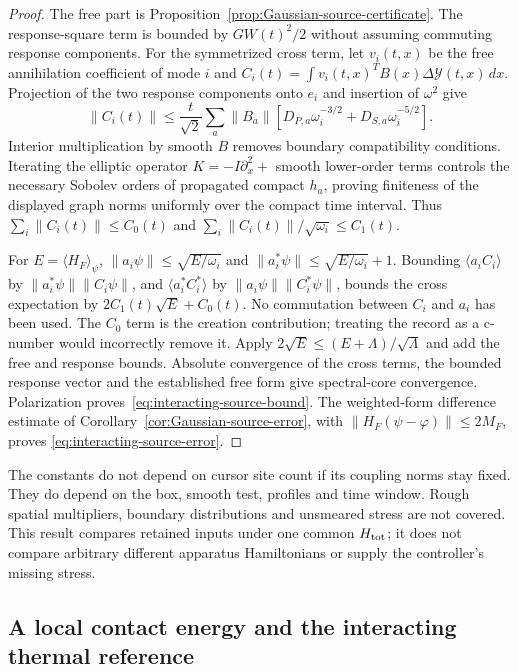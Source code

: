 \begin{proof}
The free part is Proposition~\ref{prop:Gaussian-source-certificate}.
The response-square term is bounded by $GW(t)^2/2$ without assuming
commuting response components. For the symmetrized cross term, let
$v_i(t,x)$ be the free annihilation coefficient of mode $i$ and
$C_i(t)=\int v_i(t,x)^TB(x)\Delta\mathcal Y(t,x)\,dx$.
Projection of the two response components onto $e_i$ and insertion
of $\omega^2$ give
\[
 \|C_i(t)\|\le\frac{t}{\sqrt2}\sum_a\|B_a\|
   [D_{P,a}\omega_i^{-3/2}+D_{S,a}\omega_i^{-5/2}].
\]
Interior multiplication by smooth $B$ removes boundary compatibility
conditions. Iterating the elliptic operator
$K=-I\partial_x^2+$ smooth lower-order terms controls the necessary
Sobolev orders of propagated compact $h_a$, proving finiteness of
the displayed graph norms uniformly over the compact time interval.
Thus $\sum_i\|C_i(t)\|\le C_0(t)$ and
$\sum_i\|C_i(t)\|/\sqrt{\omega_i}\le C_1(t)$.

For $E=\langle H_F\rangle_\psi$,
$\|a_i\psi\|\le\sqrt{E/\omega_i}$ and
$\|a_i^*\psi\|\le\sqrt{E/\omega_i}+1$.
Bounding $\langle a_iC_i\rangle$ by
$\|a_i^*\psi\|\|C_i\psi\|$, and
$\langle a_i^*C_i^*\rangle$ by
$\|a_i\psi\|\|C_i^*\psi\|$, bounds the cross expectation by
$2C_1(t)\sqrt E+C_0(t)$.
No commutation between $C_i$ and $a_i$ has been used.
The $C_0$ term is the creation contribution; treating the record
as a c-number would incorrectly remove it.
Apply $2\sqrt E\le(E+\Lambda)/\sqrt\Lambda$ and add the free and
response bounds. Absolute convergence of the cross terms, the bounded
response vector and the established free form give spectral-core
convergence. Polarization proves~\eqref{eq:interacting-source-bound}.
The weighted-form difference estimate of
Corollary~\ref{cor:Gaussian-source-error}, with
$\|H_F(\psi-\varphi)\|\le2M_F$, proves
\eqref{eq:interacting-source-error}.
\end{proof}

The constants do not depend on cursor site count if its coupling norms
stay fixed. They do depend on the box, smooth test, profiles and time
window. Rough spatial multipliers, boundary distributions and
unsmeared stress are not covered. This result compares retained inputs
under one common $H_{\rm tot}$; it does not compare arbitrary different
apparatus Hamiltonians or supply the controller's missing stress.

\subsection{A local contact energy and the interacting thermal reference}


